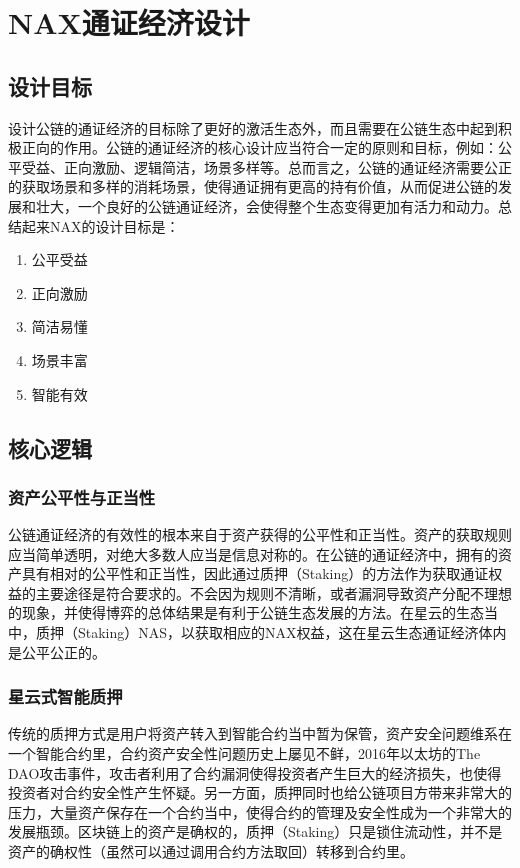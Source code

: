 \section{NAX通证经济设计}
\subsection{设计目标}
设计公链的通证经济的目标除了更好的激活生态外，而且需要在公链生态中起到积极正向的作用。公链的通证经济的核心设计应当符合一定的原则和目标，例如：公平受益、正向激励、逻辑简洁，场景多样等。总而言之，公链的通证经济需要公正的获取场景和多样的消耗场景，使得通证拥有更高的持有价值，从而促进公链的发展和壮大，一个良好的公链通证经济，会使得整个生态变得更加有活力和动力。总结起来NAX的设计目标是：

\begin{enumerate}[\hspace{2cm}(a)]
    \item 公平受益
    \item 正向激励
    \item 简洁易懂
    \item 场景丰富
    \item 智能有效
\end{enumerate}

\subsection{核心逻辑}

\subsubsection{资产公平性与正当性}
公链通证经济的有效性的根本来自于资产获得的公平性和正当性。资产的获取规则应当简单透明，对绝大多数人应当是信息对称的。在公链的通证经济中，拥有的资产具有相对的公平性和正当性，因此通过质押（Staking）的方法作为获取通证权益的主要途径是符合要求的。不会因为规则不清晰，或者漏洞导致资产分配不理想的现象，并使得博弈的总体结果是有利于公链生态发展的方法。在星云的生态当中，质押（Staking）NAS，以获取相应的NAX权益，这在星云生态通证经济体内是公平公正的。

\subsubsection{星云式智能质押}
传统的质押方式是用户将资产转入到智能合约当中暂为保管，资产安全问题维系在一个智能合约里，合约资产安全性问题历史上屡见不鲜，2016年以太坊的The DAO攻击事件，攻击者利用了合约漏洞使得投资者产生巨大的经济损失，也使得投资者对合约安全性产生怀疑。另一方面，质押同时也给公链项目方带来非常大的压力，大量资产保存在一个合约当中，使得合约的管理及安全性成为一个非常大的发展瓶颈。区块链上的资产是确权的，质押（Staking）只是锁住流动性，并不是资产的确权性（虽然可以通过调用合约方法取回）转移到合约里。

